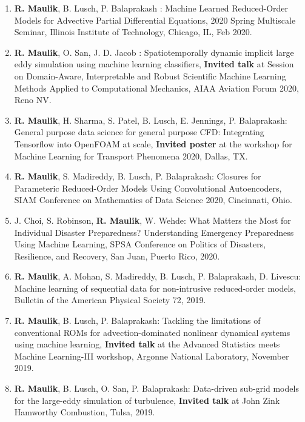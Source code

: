 \documentclass[letterpaper]{article}
\begin{document}
\begin{enumerate}
\item \textbf{R. Maulik}, B. Lusch, P. Balaprakash : Machine Learned Reduced-Order Models for Advective Partial Differential Equations, 2020 Spring Multiscale Seminar, Illinois Institute of Technology, Chicago, IL, Feb 2020.

\item \textbf{R. Maulik}, O. San, J. D. Jacob : Spatiotemporally dynamic implicit large eddy simulation using machine learning classifiers, \textbf{Invited talk} at Session on Domain-Aware, Interpretable and Robust Scientific Machine Learning Methods Applied to Computational Mechanics, AIAA Aviation Forum 2020, Reno NV. 

\item \textbf{R. Maulik}, H. Sharma, S. Patel, B. Lusch, E. Jennings, P. Balaprakash: General purpose data science for general purpose CFD: Integrating Tensorflow into OpenFOAM at scale, \textbf{Invited poster} at the workshop for Machine Learning for Transport Phenomena 2020, Dallas, TX.

\item \textbf{R. Maulik}, S. Madireddy, B. Lusch, P. Balaprakash: Closures for Parameteric Reduced-Order Models Using Convolutional Autoencoders, SIAM Conference on Mathematics of Data Science 2020, Cincinnati, Ohio.

\item J. Choi, S. Robinson, \textbf{R. Maulik}, W. Wehde: What Matters the Most for Individual Disaster Preparedness? Understanding Emergency Preparedness Using Machine Learning, SPSA Conference on Politics of Disasters, Resilience, and Recovery, San Juan, Puerto Rico, 2020.

\item \textbf{R. Maulik}, A. Mohan, S. Madireddy, B. Lusch, P. Balaprakash, D. Livescu: Machine learning of sequential data for non-intrusive reduced-order models, Bulletin of the American Physical Society 72, 2019.

\item \textbf{R. Maulik}, B. Lusch, P. Balaprakash: Tackling the limitations of conventional ROMs for advection-dominated nonlinear dynamical systems using machine learning, \textbf{Invited talk} at the Advanced Statistics meets Machine Learning-III workshop, Argonne National Laboratory, November 2019.

\item \textbf{R. Maulik}, B. Lusch, O. San, P. Balaprakash: Data-driven sub-grid models for the large-eddy simulation of turbulence, \textbf{Invited talk} at John Zink Hamworthy Combustion, Tulsa, 2019.


\end{enumerate}
\end{document}
